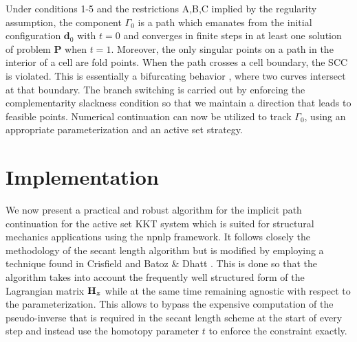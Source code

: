 Under conditions 1-5 and the restrictions A,B,C implied by the regularity 
assumption, the component $\mathit{\Gamma_0}$ is a path which emanates from 
the initial configuration $\bm{d}_0$ with $t=0$ and converges in finite steps 
in at least 
one solution
of problem \textbf{P} when $t=1$. Moreover, the only singular points
on a path in the interior of a cell are fold points. When the path crosses a
cell boundary, the SCC is violated. This is essentially a bifurcating behavior
, where two curves intersect at that boundary. The branch switching is carried
out by enforcing the complementarity slackness condition so that we maintain a
direction that leads to feasible points. Numerical continuation 
can now be utilized to track $\mathit{\Gamma_0}$, using an appropriate
parameterization and an active set strategy.


\section{Implementation}\label{CH4-S3}

We now present a practical and robust algorithm for the implicit path
continuation for the active set KKT system which is suited for structural 
mechanics applications using the
\acrshort{npnlp} framework. It follows closely
the methodology of the secant length algorithm\cite{Menzel:1985} but is modified
by employing a technique found in Crisfield\cite{Crisfield3} and Batoz \& Dhatt 
\cite{Batoz:1979}. This is done
so that the algorithm takes into account the frequently well structured form of 
the
Lagrangian matrix $\mathbf{H}_{\bm{z}}$ while at the same time remaining agnostic
with respect to the parameterization. This allows to bypass the expensive
computation of the pseudo-inverse that is required in the secant length scheme
at the start of every step and instead use the homotopy
parameter $t$ to enforce the constraint exactly. 

